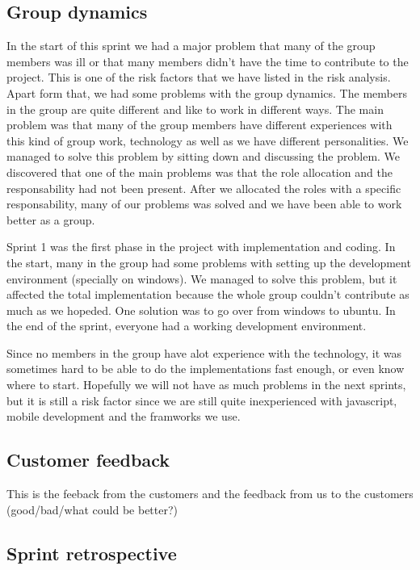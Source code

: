 \subsection{Group dynamics}
In the start of this sprint we had a major problem that many of the group members was ill or 
that many members didn't have the time to contribute to the project. This is one of the risk factors 
that we have listed in the risk analysis. 
Apart form that, we had some problems with the group dynamics. The members in the group are 
quite different and like to work in different ways. The main problem was that many of the group members
have different experiences with this kind of group work, technology as well as we have 
different personalities.
We managed to solve this problem by sitting down and discussing the problem. We discovered that
one of the main problems was that the role allocation and the responsability had not been present.
After we allocated the roles with a specific responsability, many of our problems was solved and
we have been able to work better as a group.

Sprint 1 was the first phase in the project with implementation and coding. In the start, many in the group had
some problems with setting up the development environment (specially on windows). We managed
to solve this problem, but it affected the total implementation because the whole group couldn't 
contribute as much as we hopeded. One solution was to go over from windows to ubuntu. 
In the end of the sprint, everyone had a working development environment.

Since no members in the group have alot experience with the technology, it was sometimes hard
to be able to do the implementations fast enough, or even know where to start. 
Hopefully we will not have as much problems in the next sprints, but it is still a risk factor 
since we are still quite inexperienced with javascript, mobile development and the framworks we use. 

\subsection{Customer feedback}
	This is the feeback from the customers and the feedback from us to the customers (good/bad/what could be better?)

\subsection{Sprint retrospective}
	\subsubsection*{}
	\subsubsection*{}
	\subsubsection*{}
	\subsubsection*{}
